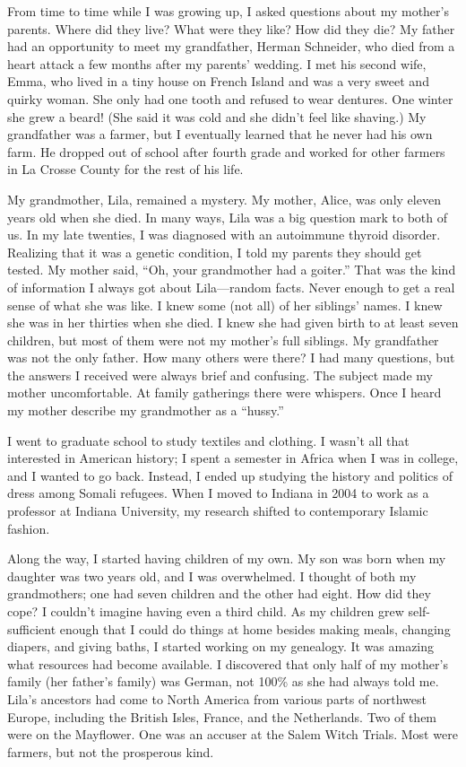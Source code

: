 \documentclass[
  letterpaper,
]{book}
\begin{document}
From time to time while I was growing up, I asked questions about my
mother's parents. Where did they live? What were they like? How did they
die? My father had an opportunity to meet my grandfather, Herman
Schneider, who died from a heart attack a few months after my parents'
wedding. I met his second wife, Emma, who lived in a tiny house on
French Island and was a very sweet and quirky woman. She only had one
tooth and refused to wear dentures. One winter she grew a beard! (She
said it was cold and she didn't feel like shaving.) My grandfather was a
farmer, but I eventually learned that he never had his own farm. He
dropped out of school after fourth grade and worked for other farmers in
La Crosse County for the rest of his life.

My grandmother, Lila, remained a mystery. My mother, Alice, was only
eleven years old when she died. In many ways, Lila was a big question
mark to both of us. In my late twenties, I was diagnosed with an
autoimmune thyroid disorder. Realizing that it was a genetic condition,
I told my parents they should get tested. My mother said, ``Oh, your
grandmother had a goiter.'' That was the kind of information I always
got about Lila---random facts. Never enough to get a real sense of what
she was like. I knew some (not all) of her siblings' names. I knew she
was in her thirties when she died. I knew she had given birth to at
least seven children, but most of them were not my mother's full
siblings. My grandfather was not the only father. How many others were
there? I had many questions, but the answers I received were always
brief and confusing. The subject made my mother uncomfortable. At family
gatherings there were whispers. Once I heard my mother describe my
grandmother as a ``hussy.''

I went to graduate school to study textiles and clothing. I wasn't all
that interested in American history; I spent a semester in Africa when I
was in college, and I wanted to go back. Instead, I ended up studying
the history and politics of dress among Somali refugees. When I moved to
Indiana in 2004 to work as a professor at Indiana University, my
research shifted to contemporary Islamic fashion.

Along the way, I started having children of my own. My son was born when
my daughter was two years old, and I was overwhelmed. I thought of both
my grandmothers; one had seven children and the other had eight. How did
they cope? I couldn't imagine having even a third child. As my children
grew self-sufficient enough that I could do things at home besides
making meals, changing diapers, and giving baths, I started working on
my genealogy. It was amazing what resources had become available. I
discovered that only half of my mother's family (her father's family)
was German, not 100\% as she had always told me. Lila's ancestors had
come to North America from various parts of northwest Europe, including
the British Isles, France, and the Netherlands. Two of them were on the
Mayflower. One was an accuser at the Salem Witch Trials. Most were
farmers, but not the prosperous kind.
\end{document}
